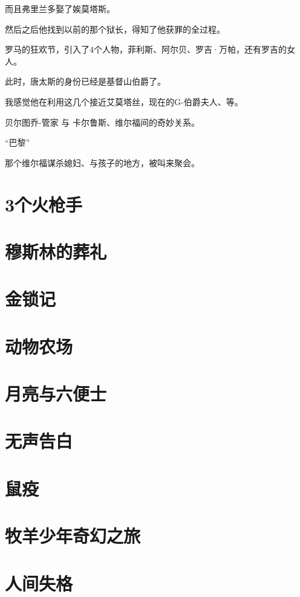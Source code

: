 \documentclass[UTF8,a4paper,12pt]{ctexbook}
\begin{document}
		而且弗里兰多娶了娭莫塔斯。
		
		然后之后他找到以前的那个狱长，得知了他获罪的全过程。
		
		罗马的狂欢节，引入了4个人物，菲利斯、阿尔贝、罗吉·万帕，还有罗吉的女人。
		
		此时，唐太斯的身份已经是基督山伯爵了。
		
		我感觉他在利用这几个接近艾莫塔丝，现在的G-伯爵夫人、等。
		
		贝尔图乔-管家 与 卡尔鲁斯、维尔福间的奇妙关系。
		
		“巴黎”
		
		那个维尔福谋杀媳妇、与孩子的地方，被叫来聚会。
		
		
	\section{3个火枪手}	
	
	\section{穆斯林的葬礼}
	
	\section{金锁记}
	
	\section{动物农场}
	
	\section{月亮与六便士}
	
	\section{无声告白}
	
	\section{鼠疫}
	
	\section{牧羊少年奇幻之旅}
	
	\section{人间失格}
	
\end{document}
